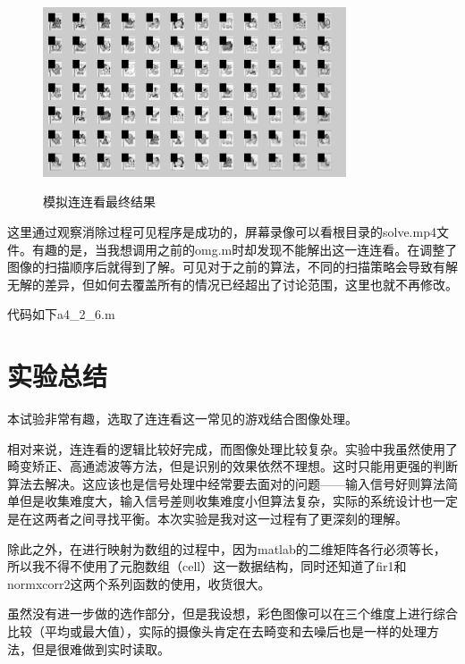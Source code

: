 \documentclass{ctexart}
\begin{document}
\begin{figure}
    \centering
    \includegraphics[width=0.8\textwidth]{process/a426.jpg}\\
    \caption{模拟连连看最终结果\label{a426}}
\end{figure}

这里通过观察消除过程可见程序是成功的，屏幕录像可以看根目录的solve.mp4文件。有趣的是，当我想调用之前的omg.m时却发现不能解出这一连连看。在调整了图像的扫描顺序后就得到了解。可见对于之前的算法，不同的扫描策略会导致有解无解的差异，但如何去覆盖所有的情况已经超出了讨论范围，这里也就不再修改。

代码如下a4\_2\_6.m


\section{实验总结}
本试验非常有趣，选取了连连看这一常见的游戏结合图像处理。

相对来说，连连看的逻辑比较好完成，而图像处理比较复杂。实验中我虽然使用了畸变矫正、高通滤波等方法，但是识别的效果依然不理想。这时只能用更强的判断算法去解决。这应该也是信号处理中经常要去面对的问题——输入信号好则算法简单但是收集难度大，输入信号差则收集难度小但算法复杂，实际的系统设计也一定是在这两者之间寻找平衡。本次实验是我对这一过程有了更深刻的理解。

除此之外，在进行映射为数组的过程中，因为matlab的二维矩阵各行必须等长，所以我不得不使用了元胞数组（cell）这一数据结构，同时还知道了fir1和normxcorr2这两个系列函数的使用，收货很大。

虽然没有进一步做的选作部分，但是我设想，彩色图像可以在三个维度上进行综合比较（平均或最大值），实际的摄像头肯定在去畸变和去噪后也是一样的处理方法，但是很难做到实时读取。
\end{document}
